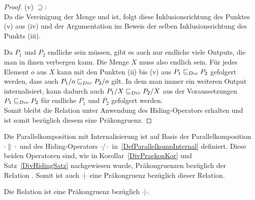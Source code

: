 \begin{proof}
  (v) \glqq $\supseteq$\grqq{}:\\
  Da \QDT{} die Vereinigung der Menge \StQT{} und \EDT{} ist, folgt diese
  Inklusionsrichtung des Punktes (v) aus (iv) und der Argumentation im Beweis
  der selben Inklusionsrichtung des Punkts (iii).

  Da $P_1$ und $P_2$ endliche sein müssen, gibt es auch nur endliche viele
  Outputs, die man in ihnen verbergen kann. Die Menge $X$ muss also endlich
  sein. Für jedes Element $o$ aus $X$ kann mit den Punkten (ii) bis (v) aus
  $P_1 \sqsubseteq  _{Div} P_2$ gefolgert werden, dass auch $P_1/o \sqsubseteq  _{Div} P_2/o$ gilt. In dem
  man immer ein weiteren Output internalisiert, kann dadurch auch $P_1/X \sqsubseteq  _{Div}
  P_2/X$ aus der Voraussetzungen $P_1 \sqsubseteq  _{Div} P_2$ für endliche \MEIO{} $P_1$ und
  $P_2$ gefolgert werden.\\
  Somit bleibt die Relation \DRel{} unter Anwendung des Hiding-Operators
  erhalten und ist somit bezüglich diesem eine Präkongruenz.
\end{proof}

Die Parallelkomposition mit Internalisierung ist auf Basis der
Parallelkomposition $\cdot \|\cdot$ und des Hiding-Operators $\cdot /\cdot$
in~\ref{DefParallelkompInternal} definiert. Diese beiden Operatoren sind, wie
in Korollar~\ref{DivPraekonKor} und Satz~\ref{DivHidingSatz} nachgewiesen
wurde, Präkongruenzen bezüglich der Relation \DRel{}. Somit ist auch $\cdot
|\cdot$ eine Präkongruenz bezüglich dieser Relation.

\begin{Kor}
  Die Relation \DRel{} ist eine Präkongruenz bezüglich $\cdot |\cdot$.
\end{Kor}
